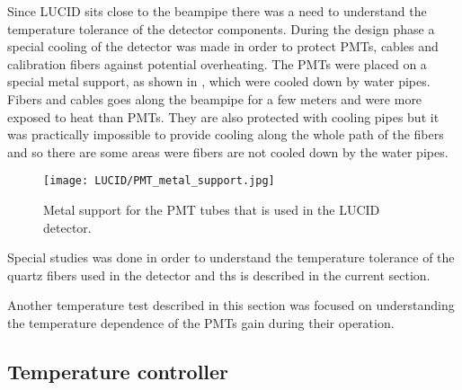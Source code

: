 Since LUCID sits close to the beampipe there was a need to understand the temperature tolerance of the detector components.
During the design phase a special cooling of the detector was made in order to protect PMTs, cables and calibration fibers against potential overheating.
The PMTs were placed on a special metal support, as shown in , which were cooled down by water pipes.
Fibers and cables goes along the beampipe for a few meters and were more exposed to heat than PMTs.
They are also protected with cooling pipes but it was practically impossible to provide cooling along the whole path of the fibers 
and so there are some areas were fibers are not cooled down by the water pipes.

\begin{figure}
\centering
\texttt{[image: LUCID/PMT\_metal\_support.jpg]}
\caption{Metal support for the PMT tubes that is used in the LUCID detector.}
\label{fig:metalSupport}
\end{figure}

Special studies was done in order to understand the temperature tolerance of the quartz fibers used in the detector and ths is described in the current section.


Another temperature test described in this section was focused on understanding the temperature dependence of the PMTs gain during their operation.

\subsection{Temperature controller}
\label{subsec:tempController}

